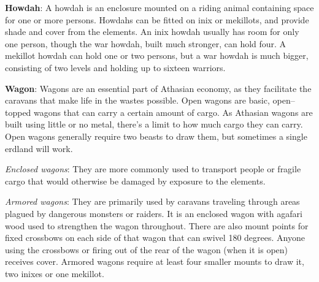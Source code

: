 \textbf{Howdah}: A howdah is an enclosure mounted on a riding animal containing space for one or more persons. Howdahs can be fitted on inix or mekillots, and provide shade and cover from the elements. An inix howdah usually has room for only one person, though the war howdah, built much stronger, can hold four. A mekillot howdah can hold one or two persons, but a war howdah is much bigger, consisting of two levels and holding up to sixteen warriors.

\textbf{Wagon}: Wagons are an essential part of Athasian economy, as they facilitate the caravans that make life in the wastes possible. Open wagons are basic, open–topped wagons that can carry a certain amount of cargo. As Athasian wagons are built using little or no metal, there’s a limit to how much cargo they can carry. Open wagons generally require two beasts to draw them, but sometimes a single erdland will work.

\textit{Enclosed wagons}: They are more commonly used to transport people or fragile cargo that would otherwise be damaged by exposure to the elements.

\textit{Armored wagons}: They are primarily used by caravans traveling through areas plagued by dangerous monsters or raiders. It is an enclosed wagon with agafari wood used to strengthen the wagon throughout. There are also mount points for fixed crossbows on each side of that wagon that can swivel 180 degrees. Anyone using the crossbows or firing out of the rear of the wagon (when it is open) receives cover. Armored wagons require at least four smaller mounts to draw it, two inixes or one mekillot.
